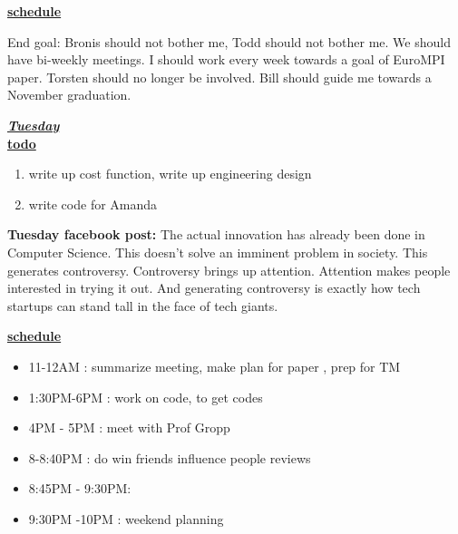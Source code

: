 \underline{\textbf{schedule}}\\
\begin{itemize}
\end{itemize}

End goal: Bronis should not bother me, Todd should not bother me. We should have bi-weekly meetings.
I should work every week towards a goal of EuroMPI paper. Torsten should no longer be involved.
Bill should guide me towards a November graduation.

\underline{\textbf{\textit{Tuesday}}}\\
\underline{\textbf{todo}}\\
\begin{enumerate}
\item write up cost function, write up engineering design  
\item write code for Amanda
\end{enumerate}

\textbf{Tuesday facebook post: } The actual innovation has already been done in Computer Science.
This doesn't solve an imminent problem in society. This generates controversy.
Controversy brings up attention. Attention makes people interested in trying it out.
And generating controversy is exactly how tech startups can stand tall in the face of tech giants.

\underline{\textbf{schedule}}\\
\begin{itemize}
\item 11-12AM :  summarize meeting, make plan for paper , prep for TM
\item 1:30PM-6PM : work on code, to get codes
\item 4PM - 5PM : meet with Prof Gropp
\item 8-8:40PM :  do win friends influence people reviews
\item 8:45PM - 9:30PM:
\item 9:30PM -10PM : weekend planning
\end{itemize}

